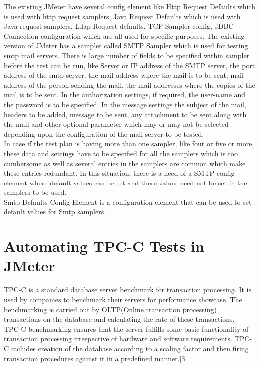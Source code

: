\documentclass[12pt]{book}
\begin{document}
The existing JMeter have several config element like Http Request Defaults which is used with
http request samplers, Java Request Defaults which is used with Java request samplers, Ldap
Request defaults, TCP Sampler config, JDBC Connection configuration which are all used for
specific purposes. The existing version of JMeter has a sampler called SMTP Sampler which is
used for testing smtp mail servers. There is large number of fields to be specified within sampler
before the test can be run, like Server or IP address of the SMTP server, the port address of the
smtp server, the mail address where the mail is to be sent, mail address of the person sending the
mail, the mail addresses where the copies of the mail is to be sent. In the authorization settings, if
required, the user-name and the password is to be specified. In the message settings the subject
of the mail, headers to be added, message to be sent, any attachment to be sent along with the
mail and other optional parameter which may or may not be selected depending upon the
configuration of the mail server to be tested.\\

In case if the test plan is having more than one sampler, like four or five or more, these data and
settings have to be specified for all the samplers which is too cumbersome as well as several
entries in the samplers are common which make these entries redundant. In this situation, there is
a need of a SMTP config element where default values can be set and these values need not be set in the samplers to be used.\\

Smtp Defaults Config Element is a configuration element that can be used to set default values
for Smtp samplers.\cite{Plugins}\cite{Plugins1}


\section{Automating TPC-C Tests in JMeter}
  TPC-C is a standard database server benchmark for transaction processing. It is used by companies to benchmark their servers for performance showcase.
  The benchmarking is carried out by OLTP(Online transaction processing) transactions on the database and calculating the rate of these transactions. \\
  TPC-C benchmarking ensures that the server fulfills some basic functionality of transaction processing irrespective of hardware and software requirements. 
  TPC-C includes creation of the database according to a scaling factor and then firing transaction procedures against it in a predefined manner.[3]\\
  
\end{document}
